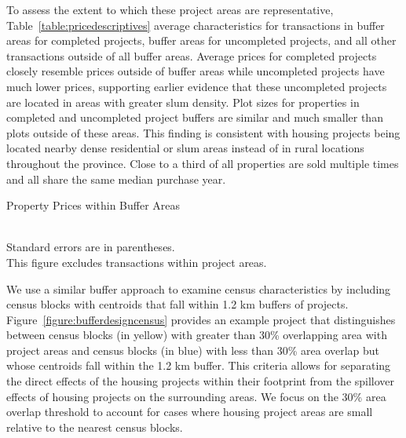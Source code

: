 \documentclass[12pt]{article}
\begin{document}
To assess the extent to which these project areas are representative, Table~\ref{table:pricedescriptives} average characteristics for transactions in buffer areas for completed projects, buffer areas for uncompleted projects, and all other transactions outside of all buffer areas.  Average prices for completed projects closely resemble prices outside of buffer areas while uncompleted projects have much lower prices, supporting earlier evidence that these uncompleted projects are located in areas with greater slum density.  Plot sizes for properties in completed and uncompleted project buffers are similar and much smaller than plots outside of these areas.  This finding is consistent with housing projects being located nearby dense residential or slum areas instead of in rural locations throughout the province.  Close to a third of all properties are sold multiple times and all share the same median purchase year.

\begin{table}
\caption{Property Prices within Buffer Areas}\label{table:pricedescriptives}
\centering
 \\
Standard errors are in parentheses.  \\ This figure excludes transactions within project areas.
\end{table}

We use a similar buffer approach to examine census characteristics by including census blocks with centroids that fall within 1.2 km buffers of projects.  Figure~\ref{figure:bufferdesigncensus} provides an example project that distinguishes between census blocks (in yellow) with greater than 30\% overlapping area with project areas and census blocks (in blue) with less than 30\% area overlap but whose centroids fall within the 1.2 km buffer.  This criteria allows for separating the direct effects of the housing projects within their footprint from the spillover effects of housing projects on the surrounding areas.  We focus on the 30\% area overlap threshold to account for cases where housing project areas are small relative to the nearest census blocks.
\end{document}
